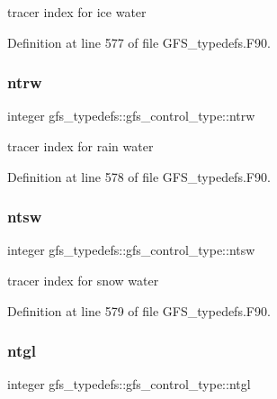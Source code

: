 tracer index for ice water 



Definition at line 577 of file G\+F\+S\+\_\+typedefs.\+F90.

\mbox{\label{structgfs__typedefs_1_1gfs__control__type_a6fb7d244785b3b874b1d7865dc80464b}} 
\subsubsection{ntrw}
{\footnotesize\ttfamily integer gfs\+\_\+typedefs\+::gfs\+\_\+control\+\_\+type\+::ntrw}



tracer index for rain water 



Definition at line 578 of file G\+F\+S\+\_\+typedefs.\+F90.

\mbox{\label{structgfs__typedefs_1_1gfs__control__type_afcd106e33490dc836b74a45bac609bcb}} 
\subsubsection{ntsw}
{\footnotesize\ttfamily integer gfs\+\_\+typedefs\+::gfs\+\_\+control\+\_\+type\+::ntsw}



tracer index for snow water 



Definition at line 579 of file G\+F\+S\+\_\+typedefs.\+F90.

\mbox{\label{structgfs__typedefs_1_1gfs__control__type_a8cde790a8051c3eb977a1352a8beff69}} 
\subsubsection{ntgl}
{\footnotesize\ttfamily integer gfs\+\_\+typedefs\+::gfs\+\_\+control\+\_\+type\+::ntgl}



